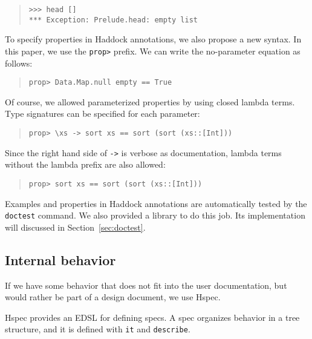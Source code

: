 \documentclass[preprint]{sigplanconf}
\newcommand{\hspec}{Hspec}
\begin{document}
\begin{quote}
\small
\begin{verbatim}
>>> head []
*** Exception: Prelude.head: empty list
\end{verbatim}
\end{quote}

To specify properties in Haddock annotations, we also propose a new syntax. In this paper, we use the {\tt prop>} prefix. We can write the no-parameter equation as follows:

\begin{quote}
\small
\begin{verbatim}
prop> Data.Map.null empty == True
\end{verbatim}
\end{quote}

\noindent Of course, we allowed parameterized properties by
using closed lambda terms.
Type signatures can be specified for each parameter:

\begin{quote}
\small
\begin{verbatim}
prop> \xs -> sort xs == sort (sort (xs::[Int]))
\end{verbatim}
\end{quote}

\noindent Since the right hand side of {\tt ->} is verbose as documentation,
lambda terms without the lambda prefix are also allowed:

\begin{quote}
\small
\begin{verbatim}
prop> sort xs == sort (sort (xs::[Int]))
\end{verbatim}
\end{quote}

Examples and properties in Haddock annotations are automatically
tested by the {\tt doctest} command. We also provided a library
to do this job. Its implementation will discussed in Section~\ref{sec:doctest}.

\subsection{Internal behavior}
\label{sec:Internal-behavior}

If we have some behavior that does not fit into the user documentation, but
would rather be part of a design document, we use \hspec{}.

\hspec{} provides an EDSL for defining specs.  A spec organizes behavior in a
tree structure, and it is defined with \texttt{it} and \texttt{describe}.
\end{document}
